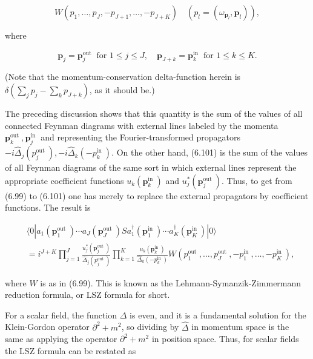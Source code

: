 \documentclass[10pt, letterpaper]{article}
\begin{document}
$$
W\left(p_{1}, \ldots, p_{J},-p_{J+1}, \ldots,-p_{J+K}\right) \quad\left(p_{l}=\left(\omega_{\mathbf{p}_{l}}, \mathbf{p}_{l}\right)\right),
$$

where

$$
\mathbf{p}_{j}=\mathbf{p}_{j}^{\text {out }} \text { for } 1 \leq j \leq J, \quad \mathbf{p}_{J+k}=\mathbf{p}_{k}^{\text {in }} \text { for } 1 \leq k \leq K .
$$

(Note that the momentum-conservation delta-function herein is $\delta\left(\sum_{j} p_{j}-\sum_{k} p_{J+k}\right)$, as it should be.)

The preceding discussion shows that this quantity is the sum of the values of all connected Feynman diagrams with external lines labeled by the momenta $\mathbf{p}_{k}^{\text {out }}, \mathbf{p}_{j}^{\text {in }}$ and representing the Fourier-transformed propagators $-i \widehat{\Delta}_{j}\left(p_{j}^{\text {out }}\right),-i \widehat{\Delta}_{k}\left(-p_{k}^{\text {in }}\right)$. On the other hand, (6.101) is the sum of the values of all Feynman diagrams of the same sort in which external lines represent the appropriate coefficient functions $u_{k}\left(\mathbf{p}_{k}^{\text {in }}\right)$ and $u_{j}^{*}\left(\mathbf{p}_{j}^{\text {out }}\right)$. Thus, to get from (6.99) to (6.101) one has merely to replace the external propagators by coefficient functions. The result is

$$
\begin{aligned}
& \langle 0| a_{1}\left(\mathbf{p}_{1}^{\text {out }}\right) \cdots a_{J}\left(\mathbf{p}_{J}^{\text {out }}\right) S a_{1}^{\dagger}\left(\mathbf{p}_{1}^{\text {in }}\right) \cdots a_{K}^{\dagger}\left(\mathbf{p}_{K}^{\text {in }}\right)|0\rangle \\
& =i^{J+K} \prod_{j=1}^{J} \frac{u_{j}^{*}\left(\mathbf{p}_{j}^{\text {out }}\right)}{\widehat{\Delta}_{j}\left(p_{j}^{\text {out }}\right)} \prod_{k=1}^{K} \frac{u_{k}\left(\mathbf{p}_{k}^{\text {in }}\right)}{\widehat{\Delta}_{k}\left(-p_{k}^{\text {in }}\right)} W\left(p_{1}^{\text {out }}, \ldots, p_{J}^{\text {out }},-p_{1}^{\text {in }}, \ldots,-p_{K}^{\text {in }}\right),
\end{aligned}
$$

where $W$ is as in (6.99). This is known as the Lehmann-Symanzik-Zimmermann reduction formula, or LSZ formula for short.

For a scalar field, the function $\Delta$ is even, and it is a fundamental solution for the Klein-Gordon operator $\partial^{2}+m^{2}$, so dividing by $\widehat{\Delta}$ in momentum space is the same as applying the operator $\partial^{2}+m^{2}$ in position space. Thus, for scalar fields the LSZ formula can be restated as
\end{document}
